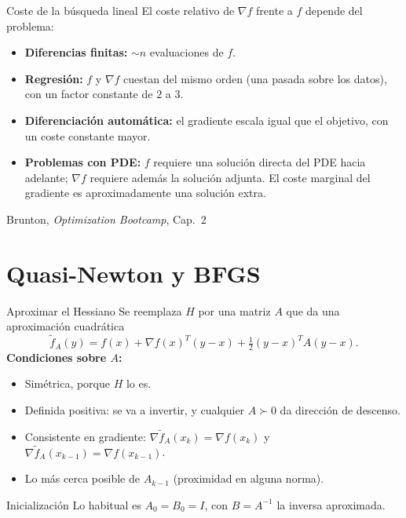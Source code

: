 \documentclass[10pt,aspectratio=169]{beamer}
\newcommand{\fuente}{\vfill{\scriptsize\color{gray}Brunton, \emph{Optimization Bootcamp}, Cap.~2}}
\begin{document}
\begin{frame}{Coste de la búsqueda lineal}
  \small
  El coste relativo de $\nabla f$ frente a $f$ depende del problema:
  \begin{itemize}
    \item \textbf{Diferencias finitas:} $\sim n$ evaluaciones de $f$.
    \item \textbf{Regresión:} $f$ y $\nabla f$ cuestan del mismo orden (una pasada
      sobre los datos), con un factor constante de $2$ a $3$.
    \item \textbf{Diferenciación automática:} el gradiente escala igual que el
      objetivo, con un coste constante mayor.
    \item \textbf{Problemas con PDE:} $f$ requiere una solución directa del PDE
      hacia adelante; $\nabla f$ requiere además la solución adjunta.
      El coste marginal del gradiente es aproximadamente una solución extra.
  \end{itemize}
  \vfill\fuente
\end{frame}

\section{Quasi-Newton y BFGS}

\begin{frame}{Aproximar el Hessiano}
  \small
  Se reemplaza $H$ por una matriz $A$ que da una aproximación cuadrática
  \[
    \tilde f_A(y)=f(x)+\nabla f(x)^{T}(y-x)+\tfrac12(y-x)^{T}A(y-x).
  \]
  \textbf{Condiciones sobre $A$:}
  \begin{itemize}
    \item Simétrica, porque $H$ lo es.
    \item Definida positiva: se va a invertir, y cualquier $A\succ0$ da dirección de descenso.
    \item Consistente en gradiente: $\nabla\tilde f_A(x_k)=\nabla f(x_k)$ y
      $\nabla\tilde f_A(x_{k-1})=\nabla f(x_{k-1})$.
    \item Lo más cerca posible de $A_{k-1}$ (proximidad en alguna norma).
  \end{itemize}
  \begin{block}{Inicialización}
    Lo habitual es $A_0=B_0=I$, con $B=A^{-1}$ la inversa aproximada.
  \end{block}
\end{frame}
\end{document}
